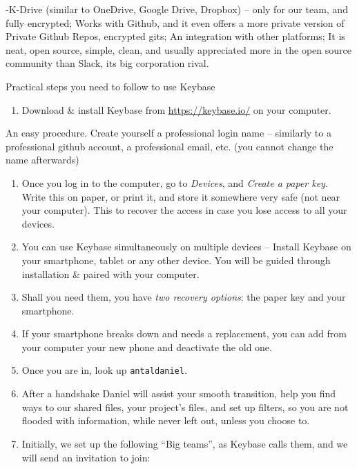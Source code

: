 \documentclass[
  a4paper,
  openany, a4paper, oneside]{book}
\providecommand{\tightlist}{%
  \setlength{\itemsep}{0pt}\setlength{\parskip}{0pt}}
\begin{document}
-K-Drive (similar to OneDrive, Google Drive, Dropbox) -- only for our team, and fully encrypted;
Works with Github, and it even offers a more private version of Private Github Repos, encrypted gits;
An integration with other platforms;
It is neat, open source, simple, clean, and usually appreciated more in the open source community than Slack, its big corporation rival.

Practical steps you need to follow to use Keybase

\begin{enumerate}
\def\labelenumi{\arabic{enumi}.}
\tightlist
\item
  Download \& install Keybase from \url{https://keybase.io/} on your computer.
\end{enumerate}

An easy procedure. Create yourself a professional login name -- similarly to a professional github account, a professional email, etc. (you cannot change the name afterwards)

\begin{enumerate}
\def\labelenumi{\arabic{enumi}.}
\setcounter{enumi}{1}
\item
  Once you log in to the computer, go to \emph{Devices}, and \emph{Create a paper key}. Write this on paper, or print it, and store it somewhere very safe (not near your computer). This to recover the access in case you lose access to all your devices.
\item
  You can use Keybase simultaneously on multiple devices -- Install Keybase on your smartphone, tablet or any other device. You will be guided through installation \& paired with your computer.
\item
  Shall you need them, you have \emph{two recovery options}: the paper key and your smartphone.
\item
  If your smartphone breaks down and needs a replacement, you can add from your computer your new phone and deactivate the old one.
\item
  Once you are in, look up \texttt{antaldaniel}.
\item
  After a handshake Daniel will assist your smooth transition, help you find ways to our shared files, your project's files, and set up filters, so you are not flooded with information, while never left out, unless you choose to.
\item
  Initially, we set up the following ``Big teams'', as Keybase calls them, and we will send an invitation to join:
\end{enumerate}
\end{document}
